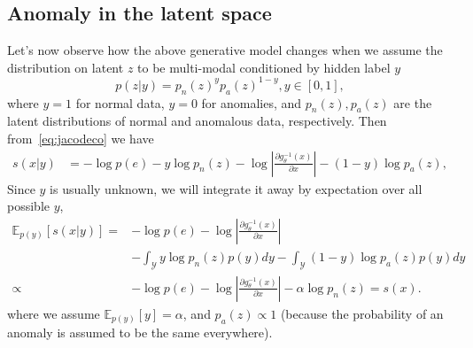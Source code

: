 \subsection{Anomaly in the latent space}
Let's now observe how the above generative model changes when we assume the distribution on latent $z$ to be multi-modal conditioned by hidden label $y$
\begin{equation} \label{eq:pzy}
p(z\vert y)=p_{n}(z)^{y}p_{a}(z)^{1-y},y\in[0,1],
\end{equation}
where $y=1$ for normal data, $y=0$ for anomalies, and $p_n(z),p_a(z)$ are the latent distributions of normal and anomalous data, respectively. Then from~\eqref{eq:jacodeco} we have
\begin{align*}
s(x \vert y) & = - \log p(e) -y\log p_{n}(z) - \log\left\vert \frac{\partial g_{\theta}^{-1}(x)}{\partial x}\right\vert -(1-y)\log p_{a}(z),
\end{align*}
Since $y$ is usually unknown, we will integrate it away by expectation over all possible $y$, 
\begin{align}
\mathbb{E}_{p(y)} \left[  s(x \vert y) \right]  = &  - \log p(e) - \log\left\vert \frac{\partial g_{\theta}^{-1}(x)}{\partial x}\right\vert \nonumber \\ 
 & - \int_{\mathcal{Y}} y\log p_{n}(z) p(y) dy - \int_{\mathcal{Y}} (1-y)\log p_{a}(z) p(y) dy \nonumber \\
   \propto & - \log p(e) - \log\left\vert \frac{\partial g_{\theta}^{-1}(x)}{\partial x}\right\vert  - \alpha\log p_{n}(z) = s(x). \label{eq:jacodeco2}
\end{align}
where we assume $\mathbb{E}_{p(y)} \left[  y \right] =\alpha$, and $p_{a}(z)\propto1$ (because the probability of an anomaly is assumed to be the same everywhere). 


